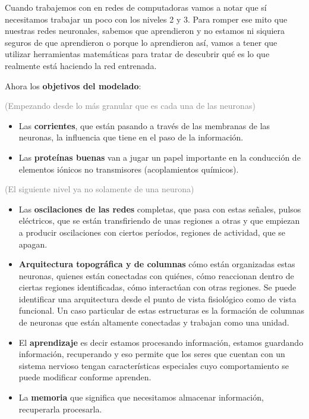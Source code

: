 Cuando trabajemos con en redes de computadoras vamos a notar que sí necesitamos trabajar un poco con los niveles 2 y 3. Para romper ese mito que nuestras redes neuronales, sabemos que aprendieron y no estamos ni siquiera seguros de que aprendieron o porque lo aprendieron así, vamos a tener que utilizar herramientas matemáticas para tratar de descubrir qué es lo que realmente está haciendo la red entrenada. 


Ahora los \textbf{objetivos del modelado}:

\textcolor{gray}{(Empezando desde lo más granular que es cada una de las neuronas)}

\begin{itemize}
 \item Las \textbf{corrientes}, que están pasando a través de las membranas de las neuronas, la influencia que tiene en el paso de la información. 
 \item Las \textbf{proteínas buenas} van a jugar un papel importante en la conducción de elementos iónicos no transmisores (acoplamientos químicos).
\end{itemize}

\textcolor{gray}{(El siguiente nivel ya no solamente de una neurona)}

\begin{itemize}
 \item Las \textbf{oscilaciones de las redes} completas, que pasa con estas señales, pulsos eléctricos, que se están transfiriendo de unas regiones a otras y que empiezan a producir oscilaciones con ciertos períodos,  regiones de actividad, que se apagan.
 \item \textbf{Arquitectura topográfica y de columnas} cómo están organizadas estas neuronas, quienes están conectadas con quiénes, cómo reaccionan dentro de ciertas regiones identificadas, cómo interactúan con otras regiones. Se puede identificar una arquitectura desde el punto de vista fisiológico como de vista funcional. Un caso particular de estas estructuras es la formación de columnas de neuronas que están altamente conectadas y trabajan como una unidad.
 \item El \textbf{aprendizaje} es decir estamos procesando información, estamos guardando información, recuperando y eso permite que los seres que cuentan con un sistema nervioso tengan características especiales cuyo comportamiento se puede modificar conforme aprenden. 
 \item La \textbf{memoria} que significa que necesitamos almacenar información, recuperarla procesarla. 
\end{itemize}



